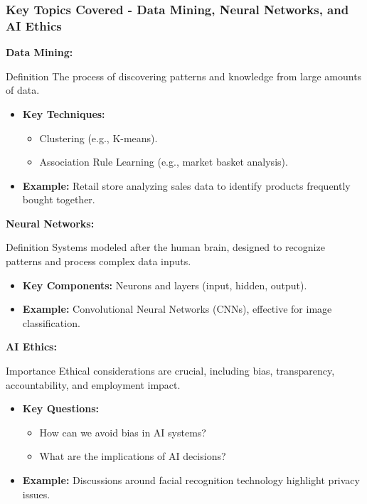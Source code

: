 \documentclass[aspectratio=169]{beamer}
\begin{document}
\begin{frame}[fragile]
    \frametitle{Key Topics Covered - Data Mining, Neural Networks, and AI Ethics}
    
    \textbf{Data Mining:}
    \begin{block}{Definition}
        The process of discovering patterns and knowledge from large amounts of data.
    \end{block}
    \begin{itemize}
        \item \textbf{Key Techniques:}
        \begin{itemize}
            \item Clustering (e.g., K-means).
            \item Association Rule Learning (e.g., market basket analysis).
        \end{itemize}
        \item \textbf{Example:} Retail store analyzing sales data to identify products frequently bought together.
    \end{itemize}

    \vspace{1em}
    
    \textbf{Neural Networks:}
    \begin{block}{Definition}
        Systems modeled after the human brain, designed to recognize patterns and process complex data inputs.
    \end{block}
    \begin{itemize}
        \item \textbf{Key Components:} Neurons and layers (input, hidden, output).
        \item \textbf{Example:} Convolutional Neural Networks (CNNs), effective for image classification.
    \end{itemize}

    \vspace{1em}
    
    \textbf{AI Ethics:}
    \begin{block}{Importance}
        Ethical considerations are crucial, including bias, transparency, accountability, and employment impact.
    \end{block}
    \begin{itemize}
        \item \textbf{Key Questions:} 
        \begin{itemize}
            \item How can we avoid bias in AI systems?
            \item What are the implications of AI decisions?
        \end{itemize}
        \item \textbf{Example:} Discussions around facial recognition technology highlight privacy issues.
    \end{itemize}
\end{frame}
\end{document}
